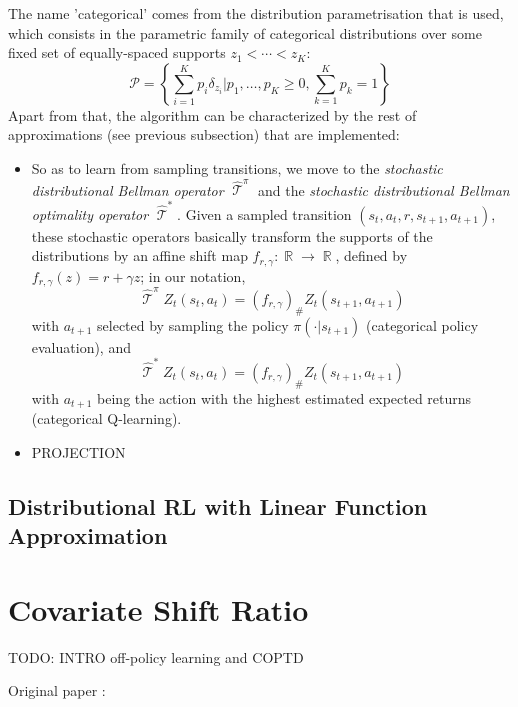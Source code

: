 \documentclass[12pt,a4paper,openright,twoside]{article}
\DeclareMathOperator*{\R}{\mathbb{R}}
\DeclareMathOperator*{\T}{\mathcal{T}}
\numberwithin{equation}{section}
\theoremstyle{definition}
\theoremstyle{remark}
\theoremstyle{plain}
\begin{document}
The name 'categorical' comes from the distribution parametrisation that is used, which consists in the parametric family of categorical distributions over some fixed set of equally-spaced supports $z_1 < \cdots < z_K$:
\begin{equation}
	\mathcal{P} = \left\{ \sum_{i=1}^{K} p_i \delta_{z_i} \Big| p_1, \dots , p_K \geq 0, \sum_{k=1}^{K} p_k = 1 \right\}
\end{equation}
Apart from that, the algorithm can be characterized by the rest of approximations (see previous subsection) that are implemented:
\begin{itemize}
	\item So as to learn from sampling transitions, we move to the \textit{stochastic distributional Bellman operator} $\widehat{\T}^\pi$ and the \textit{stochastic distributional Bellman optimality operator} $\widehat{\T}^*$. Given a sampled transition $(s_t,a_t,r,s_{t+1},a_{t+1})$, these stochastic operators basically transform the supports of the distributions by an affine shift map $f_{r,\gamma} : \R \rightarrow \R$, defined by $f_{r,\gamma}(z) = r + \gamma z$; in our notation, 
		$$\widehat{\T}^\pi Z_t(s_t,a_t) = (f_{r,\gamma})_\# Z_t(s_{t+1},a_{t+1})$$
		with $a_{t+1}$ selected by sampling the policy $\pi(\cdot | s_{t+1})$  (categorical policy evaluation), and 
		$$\widehat{\T}^* Z_t(s_t,a_t) = (f_{r,\gamma})_\# Z_t(s_{t+1},a_{t+1})$$ 
		with $a_{t+1}$ being the action with the highest estimated expected returns (categorical Q-learning).
		
	\item PROJECTION
	
\end{itemize}


\subsection{Distributional RL with Linear Function Approximation}



\newpage


\thispagestyle{plain}

\thispagestyle{plain}
\section{Covariate Shift Ratio}

TODO: INTRO off-policy learning and COPTD

Original paper \cite{COPTD}:
\end{document}
